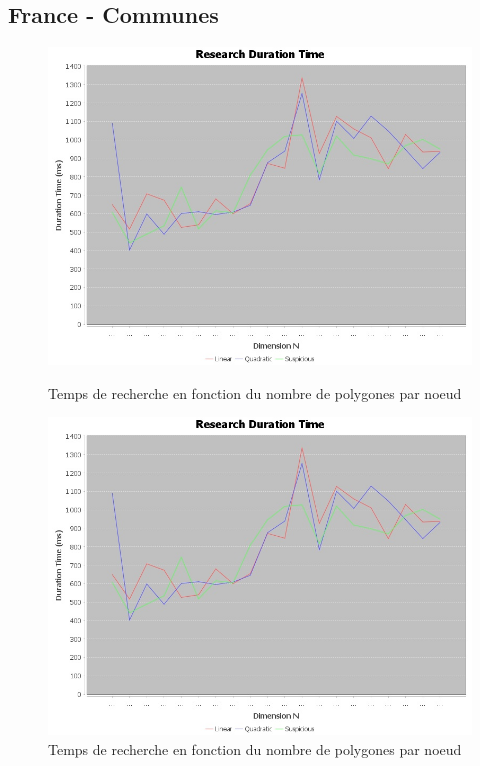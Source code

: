 \documentclass {article}
\begin{document}

\newpage
\subsection {France - Communes}\label{france}

\begin{figure}[h]
    \begin{minipage}[t]{0.46\textwidth}
	\centering
	\includegraphics[width=\textwidth]{research_graph_belgium.png}
	\caption{Temps de recherche en fonction du nombre de polygones par noeud}
	\label{fig:belgique_stat_find_lin}
    \end{minipage}
    \begin{minipage}[t]{0.46\textwidth}
	\centering
	\includegraphics[width=\textwidth]{research_graph_belgium.png}
	\caption{Temps de recherche en fonction du nombre de polygones par noeud}
	\label{fig:belgique_stat_find_quad}
    \end{minipage}
\end{figure}
\end{document}
